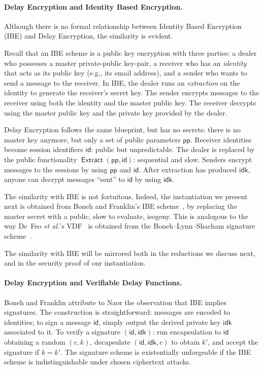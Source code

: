 \documentclass{llncs}
\DeclareMathOperator{\Extract}{\mathsf{Extract}}
\newcommand{\pp}{\mathsf{pp}}
\newcommand{\id}{\mathsf{id}}
\newcommand{\idk}{\mathsf{idk}}
\begin{document}
\paragraph{Delay Encryption and Identity Based Encryption.}
Although there is no formal relationship between Identity Based
Encryption (IBE) and Delay Encryption, the similarity is evident. 

Recall that an IBE scheme is a public key encryption with three
parties: a dealer who possesses a master private-public key-pair, a
receiver who has an \emph{identity} that acts as its public key (e.g.,
its email address), and a sender who wants to send a message to the
receiver. %
In IBE, the dealer runs an \emph{extraction} on the identity to
generate the receiver's secret key. %
The sender encrypts messages to the receiver using both the identity
and the master public key. %
The receiver decrypts using the master public key and the private key
provided by the dealer.

Delay Encryption follows the same blueprint, but has no secrets:
there is no master key anymore, but only a set of public parameters $\pp$. %
Receiver identities become session identifiers $\id$: public but
unpredictable. %
The dealer is replaced by the public functionality
$\Extract(\pp,\id)$: sequential and slow. %
Senders encrypt messages to the sessions by using $\pp$ and $\id$. %
After extraction has produced $\idk$, anyone can decrypt messages
``sent'' to $\id$ by using $\idk$.

The similarity with IBE is not fortuitous. %
Indeed, the instantiation we present next is obtained from Boneh and
Franklin's IBE scheme~\cite{doi:10.1137/S0097539701398521}, by
replacing the master secret with a public, slow to evaluate, isogeny.
This is analogous to the way De~Feo \emph{et al.}'s
VDF~\cite{10.1007/978-3-030-34578-5_10} is obtained from the
Boneh--Lynn--Shacham signature scheme~\cite{boneh+lynn+shacham04}.

The similarity with IBE will be mirrored both in the reductions we
discuss next, and in the security proof of our instantiation.

\paragraph{Delay Encryption and Verifiable Delay Functions.}
Boneh and Franklin attribute to Naor the observation that IBE implies
signatures. %
The construction is straightforward: messages are encoded to
identities; to sign a message $\id$, simply output the derived private
key $\idk$ associated to it. %
To verify a signature $(\id,\idk)$: run encapsulation to $\id$
obtaining a random $(c,k)$, decapsulate $(\id,\idk,c)$ to obtain $k'$,
and accept the signature if $k=k'$. %
The signature scheme is existentially unforgeable if the IBE scheme is
indistinguishable under chosen ciphertext attacks.
\end{document}
